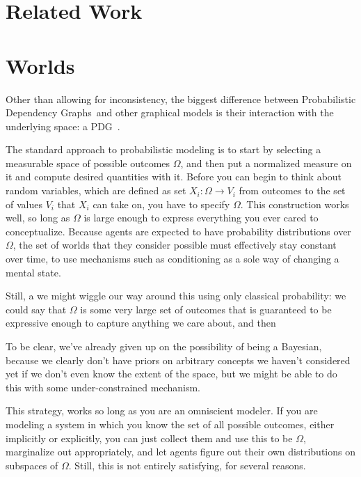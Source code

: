 \documentclass{article}
\newcommand{\modelnames}{Probabilistic Dependency Graphs}
\newcommand{\MN}{PDG}
\begin{document}
	
	\section{Related Work}

	\section{Worlds}
	Other than allowing for inconsistency, the biggest difference between \modelnames\ and other graphical models is their interaction with the underlying space: a \MN\ .
	
	The standard approach to probabilistic modeling is to start by selecting a measurable space of possible outcomes $\Omega$, and then put a normalized measure on it and compute desired quantities with it. Before you can begin to think about random variables, which are defined as set $X_i : \Omega \to V_i$ from outcomes to the set of values $V_i$ that $X_i$ can take on, you have to specify $\Omega$. This construction works well, so long as $\Omega$ is large enough to express everything you ever cared to conceptualize. Because agents are expected to have probability distributions over $\Omega$, the set of worlds that they consider possible must effectively stay constant over time, to use mechanisms such as conditioning as a sole way of changing a mental state.

	Still, a we might wiggle our way around this using only classical probability: we could say that $\Omega$ is some very large set of outcomes that is guaranteed to be expressive enough to capture anything we care about, and then

	To be clear, we've already given up on the possibility of being a Bayesian, because we clearly don't have priors on arbitrary concepts we haven't considered yet if we don't even know the extent of the space, but we might be able to do this with some under-constrained mechanism.

	This strategy, works so long as you are an omniscient modeler. If you are modeling a system in which you know the set of all possible outcomes, either implicitly or explicitly, you can just collect them and use this to be $\Omega$, marginalize out appropriately, and let agents figure out their own distributions on subspaces of $\Omega$. Still, this is not entirely satisfying, for several reasons.
\end{document}
